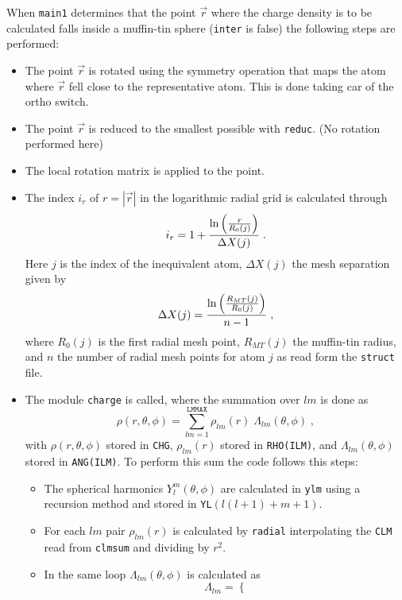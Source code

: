 \documentclass{article}
\begin{document}
When \texttt{main1} determines that the point $\vec{r}$ where the
charge density is to be calculated falls inside a muffin-tin sphere
(\texttt{inter} is false) the following steps are performed:
\begin{itemize}
\item The point $\vec{r}$ is rotated using the symmetry operation
that maps the atom where $\vec{r}$ fell close to the representative
atom. This is done taking car of the ortho switch.
\item The point $\vec{r}$ is reduced to the smallest possible with
\texttt{reduc}. (No rotation performed here)
\item The local rotation matrix is applied to the point.
\item The index $i_r$ of $r=|\vec{r}|$ in the logarithmic radial grid is
calculated through
\begin{equation}
i_r=1+{\ln \left({r\over R_0(j)}\right)\over \Delta X(j)}\;.
\end{equation} 
Here $j$ is the index of the inequivalent atom, $\Delta X(j)$ the mesh
separation given by
\begin{equation}
\Delta X(j)={\ln \left({R_{MT}(j)\over R_0(j)}\right)\over n-1}\;,
\end{equation} 
where $R_0(j)$ is the first radial mesh point, $R_{MT}(j)$ the
muffin-tin radius, and $n$ the number of radial mesh points for atom
$j$ as read form the \texttt{struct} file.
\item The module \texttt{charge} is called, where the summation over
$lm$ is done as
\begin{equation}
\rho(r,\theta,\phi)=\sum_{lm=1}^\mathtt{LMMAX}\rho_{lm}(r)\;
\Lambda_{lm}(\theta,\phi)\;,
\label{sumchg}
\end{equation}
with $\rho(r,\theta,\phi)$ stored in \texttt{CHG}, $\rho_{lm}(r)$ stored in
\texttt{RHO(ILM)}, and $\Lambda_{lm}(\theta,\phi)$ stored in \texttt{ANG(ILM)}.
To perform this sum the code follows this steps:
\begin{itemize}
\item The spherical harmonics $Y_l^m(\theta,\phi)$ are calculated in
\texttt{ylm} using a recursion method and stored in
\texttt{YL}$\left(l(l+1)+m+1\right)$.
\item For each $lm$ pair $\rho_{lm}(r)$ is calculated by
\texttt{radial} interpolating the \texttt{CLM} read from
\texttt{clmsum} and dividing by $r^2$.
\item In the same loop $\Lambda_{lm}(\theta,\phi)$ is calculated as
\[
\Lambda_{lm}=\left\{
\]
\end{itemize}
\end{itemize}
\end{document}
